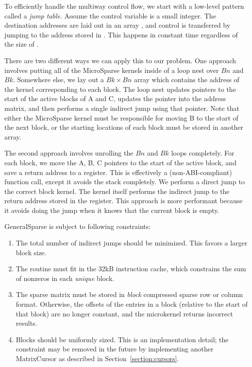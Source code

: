 To efficiently handle the multiway control flow, we start with a low-level pattern called a \emph{jump table}. Assume the control variable  is a small integer. The destination addresses are laid out in an array , and control is transferred by jumping to the address stored in . This happens in constant time regardless of the size of .

There are two different ways we can apply this to our problem. One approach involves putting all of the MicroSparse kernels inside of a loop nest over $Bn$ and $Bk$. Somewhere else, we lay out a $Bk \times Bn$ array which contains the address of the kernel corresponding to each block. The loop nest updates pointers to the start of the active blocks of A and C, updates the pointer into the address matrix, and then performs a single indirect jump using that pointer. Note that either the MicroSparse kernel must be responsible for moving B to the start of the next block, or the starting locations of each block must be stored in another array.

The second approach involves unrolling the $Bn$ and $Bk$ loops completely. For each block, we move the A, B, C pointers to the start of the active block, and save a return address to a register. This is effectively a (non-ABI-compliant) function call, except it avoids the stack completely. We perform a direct jump to the correct block kernel. The kernel itself performs the indirect jump to the return address stored in the register. This approach is more performant because it avoids doing the jump when it knows that the current block is empty.


GeneralSparse is subject to following constraints:

\begin{enumerate}

  \item The total number of indirect jumps should be minimized. This favors a larger block size.

  \item The routine must fit in the 32kB instruction cache, which constrains the sum of nonzeros in each \emph{unique} block. 

  \item The sparse matrix must be stored in \emph{block} compressed sparse row or column format. Otherwise, the offsets of the entries in a block (relative to the start of that block) are no longer constant, and the microkernel returns incorrect results. 

  \item Blocks should be uniformly sized. This is an implementation detail; the constraint may be removed in the future by implementing another MatrixCursor as described in Section~\ref{section:cursors}.

\end{enumerate}

